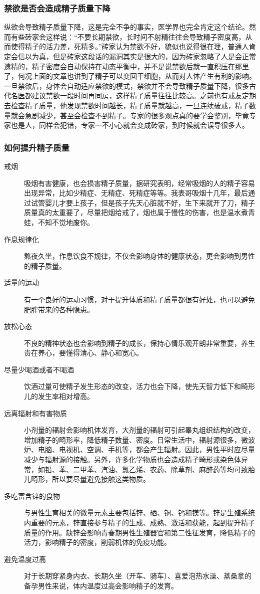 \subsubsection{禁欲是否会造成精子质量下降}

纵欲会导致精子质量下降，这是完全不争的事实，医学界也完全肯定这个结论。然而有些砖家会这样说：“不要长期禁欲，长时间不射精往往会导致精子密度高，从而使得精子的活力差，死精多。”砖家认为禁欲不好，貌似也说得很在理，普通人肯定会信以为真，但是砖家这段话的漏洞其实是很大的，因为砖家忽略了人是会正常遗精的，精子密度会自动保持在动态平衡中，并不是说禁欲后就一直积压在那里了，何况上面的文章也讲到了精子可以变回干细胞，从而对人体产生有利的影响。一旦禁欲后，身体会自动适应禁欲的模式，禁欲并不会导致精子质量下降，很多古代名医都建议禁欲一段时间再同房，这样精子质量往往比较高。之前也有戒友定期去检查精子质量，他发现禁欲时间越长，精子质量就越高，一旦连续破戒，精子数量就会急剧减少，甚至会检查不到精子。专家的很多观点真的要学会鉴别，毕竟专家也是人，同样会犯错，专家一不小心就会变成砖家，到时候就会误导很多人。

\subsubsection{如何提升精子质量}

\begin{description}
    \item[戒烟] 吸烟有害健康，也会损害精子质量，据研究表明，经常吸烟的人的精子容易出现异常，比如少精症、无精症、死精症等等。我表哥吸烟十几年，最后通过试管婴儿才要上孩子，但是孩子先天心脏就不好，生下来就开了刀，精子质量真的太重要了，尽量把烟给戒了，烟也属于慢性的伤害，也是温水煮青蛙，不知不觉地废你。
    \item[作息规律化] 熬夜久坐，作息饮食不规律，不仅会影响身体的健康状态，更会影响到男性的精子质量。
    \item[适量的运动] 有一个良好的运动习惯，对于提升体质和精子质量都很有好处，也可以避免肥胖带来的各种隐患。
    \item[放松心态] 不良的精神状态也会影响到精子的成长，保持心情乐观开朗非常重要，养生贵在养心，要懂得清心、静心和宽心。
    \item[尽量少喝酒或者不喝酒] 饮酒过量可使精子发生形态的改变，活力也会下降，使先天智力低下和畸形儿的发生率相对增高。
    \item[远离辐射和有害物质] 小剂量的辐射会影响机体发育，大剂量的辐射可引起睾丸组织结构的改变，增加精子的畸形率，降低精子数量、密度。日常生活中，辐射源很多，微波炉、电脑、电视机、空调、手机等，都会产生辐射。因此，男性平时应尽量减少与辐射源的接触。另外，许多化学物质也会造成精子畸形或染色体异常，如铅、苯、二甲苯、汽油、氯乙烯、农药、除草剂、麻醉药等均可致胎儿畸形，所以要尽量避免接触这类物质。
    \item[多吃富含锌的食物] 与男性生育相关的微量元素主要包括锌、硒、铜、钙和镁等。锌是生殖系统内重要的元素，锌直接参与精子的生成、成熟、激活和获能，起到提升精子质量的作用。缺锌会影响青春期男性生殖器官和第二性征发育，降低精子的活力，影响精子的密度，削弱机体的免疫功能。
    \item[避免温度过高] 对于长期穿紧身内衣、长期久坐（开车、骑车）、喜爱泡热水澡、蒸桑拿的备孕男性来说，体内温度过高会影响精子的发育。
\end{description}


